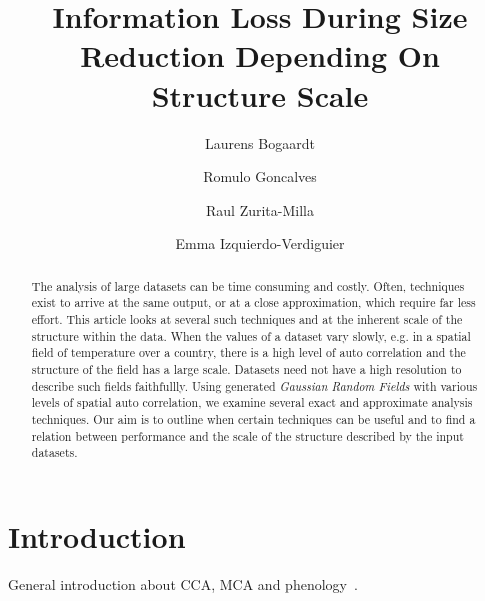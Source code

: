\documentclass{acm_proc_article-sp}
\begin{document}
\title{\textbf{Information Loss During Size Reduction Depending On Structure Scale}}

\author[1]{Laurens Bogaardt}
\author[1]{Romulo Goncalves}
\author[2]{Raul Zurita-Milla}
\author[2,3]{Emma Izquierdo-Verdiguier}


\date{} %
\maketitle\thispagestyle{empty} %

\begin{abstract}
The analysis of large datasets can be time consuming and costly. Often, techniques exist to arrive at the same output, or at a close approximation, which require far less effort. This article looks at several such techniques and at the inherent scale of the structure within the data. When the values of a dataset vary slowly, e.g. in a spatial field of temperature over a country, there is a high level of auto correlation and the structure of the field has a large scale. Datasets need not have a high resolution to describe such fields faithfullly. Using generated \textit{Gaussian Random Fields} with various levels of spatial auto correlation, we examine several exact and approximate analysis techniques. Our aim is to outline when certain techniques can be useful and to find a relation between performance and the scale of the structure described by the input datasets.
\end{abstract}

\section{Introduction}
\label{sec:Introduction}

General introduction about CCA, MCA and phenology~\cite{Eshel2011, Storch1999}.
\end{document}
